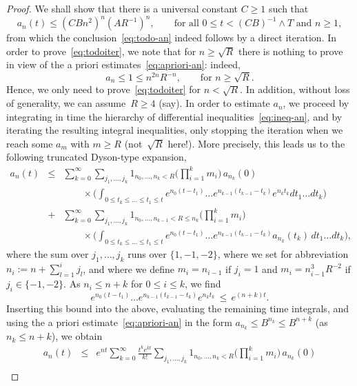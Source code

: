 \documentclass[a4paper,11pt,reqno,noindent]{amsart}
\theoremstyle{plain}
\theoremstyle{definition}
\numberwithin{equation}{section}
\begin{document}
\begin{proof}
We shall show that there is a universal constant $C\ge1$ such that
\begin{equation}\label{eq:todoiter}
a_n(t)\le (CBn^2)^n(AR^{-1} )^n,\qquad\text{for all $0\le t< (CB)^{-1}\wedge T$ and $n\ge1$},
\end{equation}
from which the conclusion~\eqref{eq:todo-an} indeed follows by a direct iteration.
In order to prove~\eqref{eq:todoiter}, we note that for $n\ge\sqrt R$ there is nothing to prove in view of the a priori estimates~\eqref{eq:apriori-an}: indeed,
\[a_n\le1\le n^{2n}R^{-n},\qquad\text{for $n\ge \sqrt R$}.\]
Hence, we only need to prove~\eqref{eq:todoiter} for $n<\sqrt R$.
In addition, without loss of generality, we can assume~$R\ge4$ (say).
In order to estimate $a_n$, we proceed by integrating in time the hierarchy of differential inequalities~\eqref{eq:ineq-an}, and by iterating the resulting integral inequalities, only stopping the iteration when we reach some $a_m$ with $m\ge R$ (not~$\sqrt R$ here!).
More precisely, this leads us to the following truncated Dyson-type expansion,
\begin{eqnarray*}
a_n(t)&\le&\sum_{k=0}^\infty\sum_{j_1,\ldots,j_k}1_{n_0,\ldots,n_k<R}\Big(\prod_{i=1}^km_i\Big)\,a_{n_k}(0)\\
&&\qquad\times\Big(\int_{0\le t_k\le\ldots\le t_1\le t}e^{n_0(t-t_1)}\ldots e^{n_{k-1}(t_{k-1}-t_k)}e^{n_kt_k}dt_1\ldots dt_k\Big)\\
&+&\sum_{k=0}^\infty\sum_{j_1,\ldots,j_k}1_{n_0,\ldots,n_{k-1}<R\le n_k}\Big(\prod_{i=1}^km_i\Big)\\
&&\qquad\times\Big(\int_{0\le t_k\le\ldots\le t_1\le t}e^{n_0(t-t_1)}\ldots e^{n_{k-1}(t_{k-1}-t_k)}a_{n_k}(t_k)\,dt_1\ldots dt_k\Big),
\end{eqnarray*}
where the sum over $j_1,\ldots,j_k$ runs over $\{1,-1,-2\}$, where we set for abbreviation $n_i:=n+\sum_{l=1}^ij_l$, and where we define $m_i=n_{i-1}$ if $j_i=1$ and $m_i=n_{i-1}^3R^{-2}$ if $j_i\in\{-1,-2\}$.
As $n_i\le n+k$ for $0\le i\le k$, we find
\[e^{n_0(t-t_1)}\ldots e^{n_{k-1}(t_{k-1}-t_k)}e^{n_kt_k}\,\le\, e^{(n+k)t}.\]
Inserting this bound into the above, evaluating the remaining time integrals, and using the a priori estimate~\eqref{eq:apriori-an} in the form $a_{n_k}\le B^{n_k}\le B^{n+k}$ (as $n_k\le n+k$), we obtain
\begin{eqnarray}
a_n(t)&\le&e^{nt}\sum_{k=0}^\infty \tfrac{t^ke^{kt}}{k!}\sum_{j_1,\ldots,j_k}1_{n_0,\ldots,n_k<R}\Big(\prod_{i=1}^km_i\Big)\,a_{n_k}(0)\nonumber\\

\end{eqnarray}
\end{proof}
\end{document}
